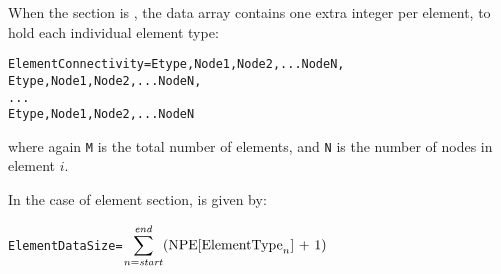 When the section  is , the data array
 contains one extra integer per element,
to hold each individual element type:
\begin{alltt}
  ElementConnectivity = Etype, Node1, Node2, ... NodeN,
                        Etype, Node1, Node2, ... NodeN,
                        ...
                        Etype, Node1, Node2, ... NodeN
\end{alltt}
\begin{changes}where again \texttt{M} is the total number of elements, and
\texttt{N} is the number of nodes in element $i$.\end{changes}
In the case of  element section,  is
given by:
\begin{alltt}
  ElementDataSize = \(\displaystyle\sum\sb{n=\mbox{\scriptsize\ital{start}}}\sp{\mbox{\scriptsize\ital{end}}} (\mbox{NPE[ElementType}\sb{n}\mbox{] + 1})\)
\end{alltt}

